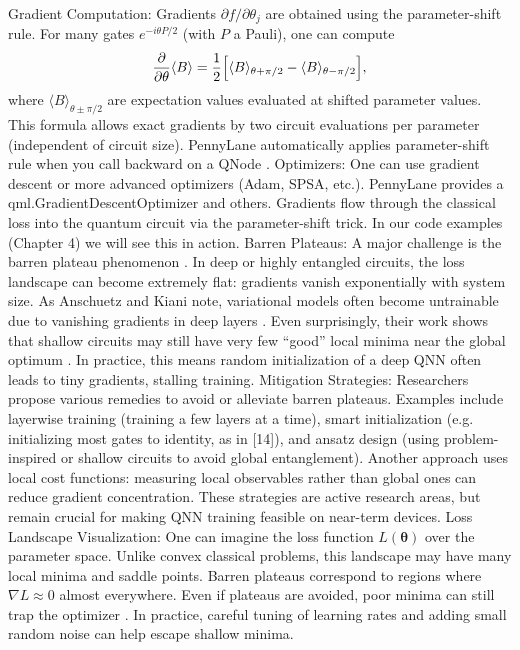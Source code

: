 Gradient Computation: Gradients $\partial f/\partial\theta_j$ are obtained using the parameter-shift rule.  For many gates $e^{-i\theta P/2}$ (with $P$ a Pauli), one can compute
$$\frac{\partial}{\partial\theta}\langle B\rangle
= \frac{1}{2}\Bigl[\langle B\rangle_{\theta+\pi/2} - \langle B\rangle_{\theta-\pi/2}\Bigr],$$
where $\langle B\rangle_{\theta\pm\pi/2}$ are expectation values evaluated at shifted parameter values.  This formula allows exact gradients by two circuit evaluations per parameter (independent of circuit size).  PennyLane automatically applies parameter-shift rule when you call backward on a QNode .
Optimizers: One can use gradient descent or more advanced optimizers (Adam, SPSA, etc.). PennyLane provides a qml.GradientDescentOptimizer and others.  Gradients flow through the classical loss into the quantum circuit via the parameter-shift trick. In our code examples (Chapter 4) we will see this in action.
Barren Plateaus: A major challenge is the barren plateau phenomenon .  In deep or highly entangled circuits, the loss landscape can become extremely flat: gradients vanish exponentially with system size.  As Anschuetz and Kiani note, variational models often become untrainable due to vanishing gradients in deep layers .  Even surprisingly, their work shows that shallow circuits may still have very few “good” local minima near the global optimum .  In practice, this means random initialization of a deep QNN often leads to tiny gradients, stalling training.
Mitigation Strategies: Researchers propose various remedies to avoid or alleviate barren plateaus.  Examples include layerwise training (training a few layers at a time), smart initialization (e.g. initializing most gates to identity, as in [14]), and ansatz design (using problem-inspired or shallow circuits to avoid global entanglement).  Another approach uses local cost functions: measuring local observables rather than global ones can reduce gradient concentration.  These strategies are active research areas, but remain crucial for making QNN training feasible on near-term devices.
Loss Landscape Visualization: One can imagine the loss function $L(\boldsymbol\theta)$ over the parameter space.  Unlike convex classical problems, this landscape may have many local minima and saddle points.  Barren plateaus correspond to regions where $\nabla L\approx 0$ almost everywhere.  Even if plateaus are avoided, poor minima can still trap the optimizer .  In practice, careful tuning of learning rates and adding small random noise can help escape shallow minima.




